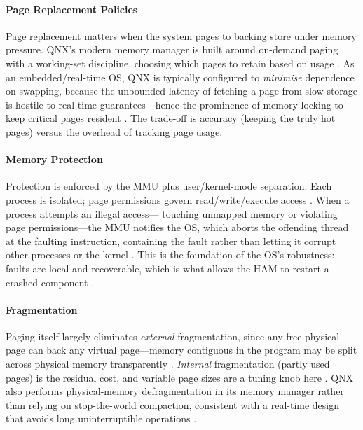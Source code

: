 \paragraph{Page Replacement Policies}

Page replacement matters when the system pages to backing store under
memory pressure. QNX's modern memory manager is built around on-demand
paging with a working-set discipline, choosing which pages to retain
based on usage \citep{membarrier_qnx8_mem}. As an embedded/real-time
OS, QNX is typically configured to \emph{minimise} dependence on
swapping, because the unbounded latency of fetching a page from slow
storage is hostile to real-time guarantees---hence the prominence of
memory locking to keep critical pages resident \citep{qnx_memman}. The
trade-off is accuracy (keeping the truly hot pages) versus the overhead
of tracking page usage.

\paragraph{Memory Protection}

Protection is enforced by the MMU plus user/kernel-mode separation.
Each process is isolated; page permissions govern read/write/execute
access \citep{qnx_memman}. When a process attempts an illegal access---
touching unmapped memory or violating page permissions---the MMU
notifies the OS, which aborts the offending thread at the faulting
instruction, containing the fault rather than letting it corrupt other
processes or the kernel \citep{qnx_memman}. This is the foundation of
the OS's robustness: faults are local and recoverable, which is what
allows the HAM to restart a crashed component \citep{qnx_ham}.

\paragraph{Fragmentation}

Paging itself largely eliminates \emph{external} fragmentation, since
any free physical page can back any virtual page---memory contiguous in
the program may be split across physical memory transparently
\citep{qnx_memman}. \emph{Internal} fragmentation (partly used pages)
is the residual cost, and variable page sizes are a tuning knob here
\citep{qnx_memman}. QNX also performs physical-memory defragmentation in
its memory manager rather than relying on stop-the-world compaction,
consistent with a real-time design that avoids long uninterruptible
operations \citep{qnx_memman}.


